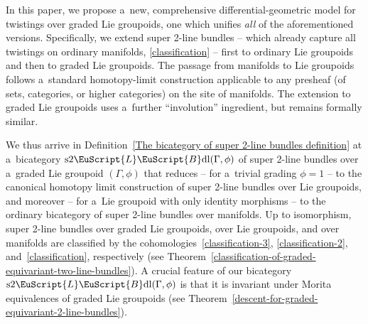\documentclass[pdftex]{sigma}
\numberwithin{equation}{section}
\def\mathscr#1{\EuScript{#1}}
\newcommand{\LineBdl}{\mathscr{L}\mathscr{B}\mathrm{dl}}
\newcommand{\stwoLineBdl}{\mathrm{s}2\LineBdl}
\begin{document}
In this paper, we propose a~new, comprehensive differential-geometric model for twistings over graded Lie groupoids, one which unifies \emph{all} of the aforementioned versions. Specifically, we extend super 2-line bundles -- which already capture all twistings on ordinary manifolds, \eqref{classification} -- first to ordinary Lie groupoids and then to graded Lie groupoids. The passage from manifolds to Lie groupoids follows a~standard homotopy-limit construction applicable to any presheaf (of sets, categories, or higher categories) on the site of manifolds. The extension to graded Lie groupoids uses a~further ``involution'' ingredient, but remains formally similar.

We thus arrive in Definition~\ref{The bicategory of super 2-line bundles definition} at a~bicategory $\stwoLineBdl(\Gamma,\phi)$ of super 2-line bundles over a~graded Lie groupoid $(\Gamma,\phi)$ that reduces -- for a~trivial grading $\phi=1$ -- to the canonical homotopy limit construction of super 2-line bundles over Lie groupoids, and moreover -- for a~Lie groupoid with only identity morphisms -- to the ordinary bicategory of super 2-line bundles over manifolds. Up to isomorphism, super 2-line bundles over graded Lie groupoids, over Lie groupoids, and over manifolds are classified by the cohomologies~\eqref{classification-3}, \eqref{classification-2}, and~\eqref{classification}, respectively (see Theorem~\ref{classification-of-graded-equivariant-two-line-bundles}). A crucial feature of our bicategory $\stwoLineBdl(\Gamma,\phi)$ is that it is invariant under Morita equivalences of graded Lie groupoids (see Theorem~\ref{descent-for-graded-equivariant-2-line-bundles}).
\end{document}

